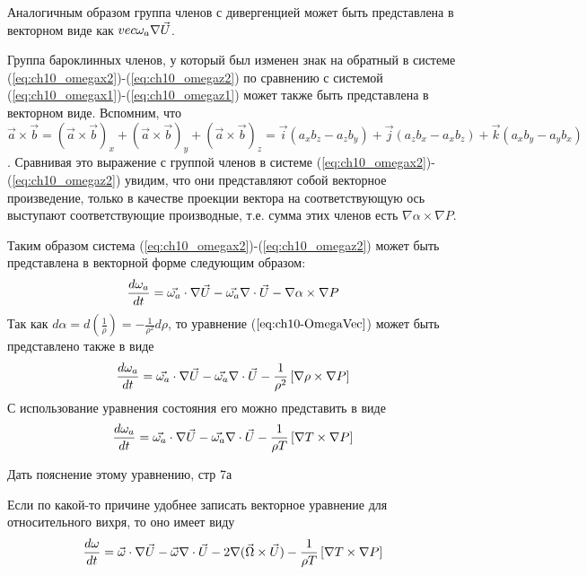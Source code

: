 Аналогичным образом группа членов  с дивергенцией может быть представлена в векторном виде как $\\vec{\omega_a}\nabla\vec{U}$. 

Группа бароклинных членов, у который был изменен знак на обратный в системе (\ref{eq:ch10_omegax2})-(\ref{eq:ch10_omegaz2}) по сравнению с системой (\ref{eq:ch10_omegax1})-(\ref{eq:ch10_omegaz1}) может также быть представлена в векторном виде. Вспомним, что $\vec{a}\times\vec{b}=(\vec{a}\times\vec{b})_x+(\vec{a}\times\vec{b})_y+(\vec{a}\times\vec{b})_z=\vec{i}(a_xb_z-a_zb_y)+\vec{j}(a_zb_x-a_xb_z)+\vec{k}(a_xb_y-a_yb_x)$. Сравнивая это выражение с группой членов  в системе (\ref{eq:ch10_omegax2})-(\ref{eq:ch10_omegaz2}) увидим, что они представляют собой векторное произведение, только в качестве проекции вектора на соответствующую ось выступают соответствующие производные, т.е. сумма этих членов есть $\nabla\alpha\times\nabla P$. 

Таким образом система (\ref{eq:ch10_omegax2})-(\ref{eq:ch10_omegaz2}) может быть представлена в векторной форме следующим образом:
\begin{equation}
\label{eq:ch10-OmegaVec}
    \displaystyle\frac{d \omega_a}{d t}=\vec{\omega_a}\cdot\nabla{\vec{U}} - \vec{\omega_a}\nabla\cdot\vec{U} - \nabla\alpha \times \nabla P
\end{equation}
Так как $d\alpha=d \left( \frac{1}{\rho} \right)=-\frac{1}{\rho^2}d\rho$, то уравнение ($\ref{eq:ch10-OmegaVec}$) может быть представлено также в виде
\begin{equation}
\label{eq:ch10-OmegaVec1}
    \displaystyle\frac{d \omega_a}{d t}=\vec{\omega_a}\cdot\nabla{\vec{U}} - \vec{\omega_a}\nabla\cdot\vec{U} - \frac{1}{\rho^2} \left[ \nabla\rho \times \nabla P \right]
\end{equation}
С использование уравнения состояния его можно представить в виде
\begin{equation}
\label{eq:ch10-OmegaVec2}
    \displaystyle\frac{d \omega_a}{d t}=\vec{\omega_a}\cdot\nabla{\vec{U}} - \vec{\omega_a}\nabla\cdot\vec{U} - \frac{1}{\rho T} \left[ \nabla T \times \nabla P \right]
\end{equation}
\begin{warn}
    Дать пояснение этому уравнению, стр 7а
\end{warn}
Если по какой-то причине удобнее записать векторное уравнение для относительного вихря, то оно имеет виду 
\begin{equation}
\label{eq:ch10-OmegaVec3}
    \displaystyle\frac{d \omega}{d t}=\vec{\omega}\cdot\nabla{\vec{U}} - \vec{\omega}\nabla\cdot\vec{U} - 
    2\nabla(\vec{\Omega}\times\vec{U}) -\frac{1}{\rho T} \left[  \nabla T \times \nabla P \right]
\end{equation}

